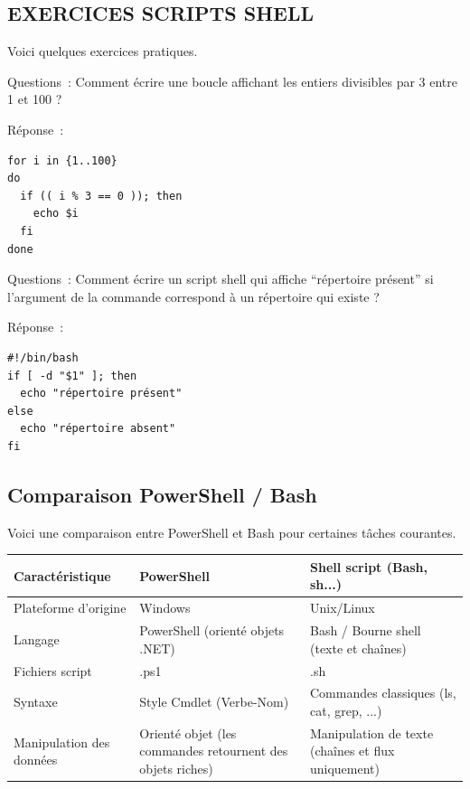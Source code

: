 \subsection*{EXERCICES SCRIPTS SHELL}
{}
\noindent Voici quelques exercices pratiques.

Questions~: Comment écrire une boucle affichant les entiers divisibles par 3 entre 1 et 100 ?

\noindent Réponse~:
\begin{verbatim}
for i in {1..100}
do
  if (( i % 3 == 0 )); then
	echo $i
  fi
done
\end{verbatim}

Questions~: Comment écrire un script shell qui affiche “répertoire présent” si l’argument de la commande correspond à un répertoire qui existe ?

\noindent Réponse~:
\begin{verbatim}
#!/bin/bash
if [ -d "$1" ]; then
  echo "répertoire présent"
else
  echo "répertoire absent"
fi
\end{verbatim}

\newpage

\subsection*{Comparaison PowerShell / Bash}
{}
\noindent Voici une comparaison entre PowerShell et Bash pour certaines tâches courantes.

\vspace{0.5cm}

\begin{center}
\begin{tabular}{|p{3.5cm}|p{5cm}|p{5cm}|}
\hline
\textbf{Caractéristique} & \textbf{PowerShell} & \textbf{Shell script (Bash, sh...)} \\
\hline
Plateforme d'origine & Windows & Unix/Linux \\
\hline
Langage & PowerShell (orienté objets .NET) & Bash / Bourne shell (texte et chaînes) \\
\hline
Fichiers script & .ps1 & .sh \\
\hline
Syntaxe & Style Cmdlet (Verbe-Nom) & Commandes classiques (ls, cat, grep, ...) \\
\hline
Manipulation des données & Orienté objet (les commandes retournent des objets riches) & Manipulation de texte (chaînes et flux uniquement) \\
\hline
\end{tabular}
\end{center}

